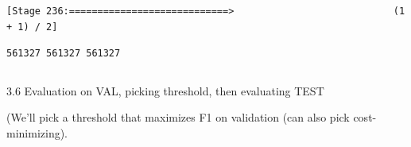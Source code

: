 \documentclass[11pt]{article}
\begin{document}
    \begin{Verbatim}[commandchars=\\\{\}]
[Stage 236:============================>                            (1 + 1) / 2]
    \end{Verbatim}

    \begin{Verbatim}[commandchars=\\\{\}]
561327 561327 561327
    \end{Verbatim}

    \begin{Verbatim}[commandchars=\\\{\}]

    \end{Verbatim}

    3.6 Evaluation on VAL, picking threshold, then evaluating TEST

(We'll pick a threshold that maximizes F1 on validation (can also pick
cost-minimizing).
\end{document}
